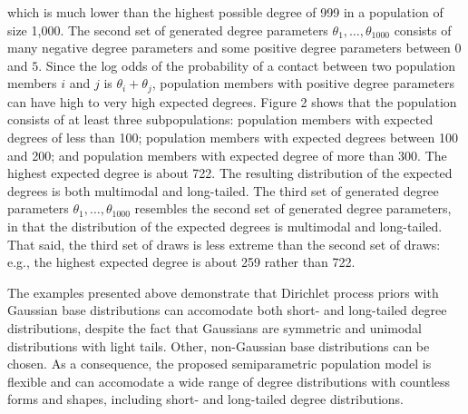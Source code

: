 which is much lower than the highest possible degree of 999 in a population of size 1,000.
The second set of generated degree parameters $\theta_1, \dots, \theta_{1000}$ consists of many negative degree parameters and some positive degree parameters between $0$ and $5$.
Since the log odds of the probability of a contact between two population members $i$ and $j$ is $\theta_i + \theta_j$,
population members with positive degree parameters can have high to very high expected degrees.
Figure 2 shows that the population consists of at least three subpopulations:
population members with expected degrees of less than 100;
population members with expected degrees between 100 and 200;
and population members with expected degree of more than 300.
The highest expected degree is about 722.
The resulting distribution of the expected degrees is both multimodal and long-tailed.
The third set of generated degree parameters $\theta_1, \dots, \theta_{1000}$ resembles the second set of generated degree parameters,
in that the distribution of the expected degrees is multimodal and long-tailed.
That said,
the third set of draws is less extreme than the second set of draws:
e.g.,
the highest expected degree is about 259 rather than 722.

The examples presented above demonstrate that Dirichlet process priors with Gaussian base distributions can accomodate both short- and long-tailed degree distributions,
despite the fact that Gaussians are symmetric and unimodal distributions with light tails.
Other, non-Gaussian base distributions can be chosen.
As a consequence,
the proposed semiparametric population model is flexible and can accomodate a wide range of degree distributions with countless forms and shapes,
including short- and long-tailed degree distributions.

